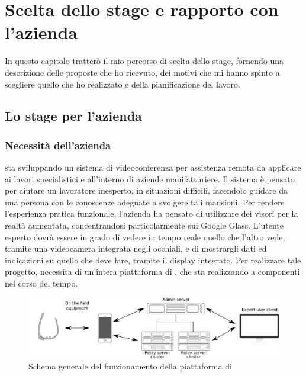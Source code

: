 \chapter{Scelta dello stage e rapporto con l'azienda}
In questo capitolo tratterò il mio percorso di scelta dello stage, fornendo una descrizione delle proposte che ho ricevuto, dei motivi che mi hanno spinto a scegliere quello che ho realizzato e della pianificazione del lavoro.

\section{Lo stage per l'azienda}

   \subsection{Necessità dell'azienda}
   \nomeAzienda{} sta sviluppando un sistema di videoconferenza per assistenza remota da applicare ai lavori specialistici e all'interno di aziende manifatturiere. Il sistema è pensato per aiutare un lavoratore inesperto, in situazioni difficili, facendolo guidare da una persona con le conoscenze adeguate a svolgere tali mansioni. Per rendere l'esperienza pratica funzionale, l'azienda ha pensato di utilizzare dei visori per la realtà aumentata, concentrandosi particolarmente sui Google Glass. L'utente esperto dovrà essere in grado di vedere in tempo reale quello che l'altro vede, tramite una videocamera integrata negli occhiali, e di mostrargli dati ed indicazioni su quello che deve fare, tramite il display integrato. Per realizzare tale progetto, \nomeAzienda{} necessita di un'intera piattaforma di , che sta realizzando a componenti nel corso del tempo.
   \begin{figure}[H]
      \begin{center}
         \includegraphics[width=16.5cm,keepaspectratio]{immagini/erastreaming-schema}
      \end{center}
      \caption{Schema generale del funzionamento della piattaforma di }
   \end{figure}
